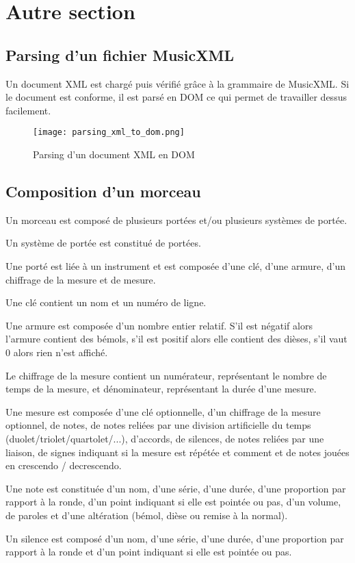 \section{Autre section}

\subsection{Parsing d'un fichier MusicXML}

Un document XML est chargé puis vérifié grâce à la grammaire de MusicXML. Si le document est conforme, il est parsé en DOM ce qui permet de travailler dessus facilement.

\begin{figure}[!h]
\centering
\texttt{[image: parsing\_xml\_to\_dom.png]}\\[1cm]
\caption{Parsing d'un document XML en DOM}
\label{Parsing d'un document XML en DOM}
\end{figure}



\subsection{Composition d'un morceau}


Un morceau est composé de plusieurs portées et/ou plusieurs systèmes de portée.
\par
Un système de portée est constitué de portées.
\par
Une porté est liée à un instrument et est composée d’une clé, d’une armure, d’un chiffrage de la mesure et de mesure.
\par
Une clé contient un nom et un numéro de ligne.
\par
Une armure est composée d'un nombre entier relatif. S'il est négatif alors l'armure contient des bémols, s'il est positif alors elle contient des dièses, s'il vaut 0 alors rien n'est affiché.
\par
Le chiffrage de la mesure contient un numérateur, représentant le nombre de temps de la mesure, et dénominateur, représentant la durée d’une mesure.
\par
Une mesure est composée d'une clé optionnelle, d'un chiffrage de la mesure optionnel, de notes, de notes reliées par une division artificielle du temps (duolet/triolet/quartolet/...), d'accords, de silences, de notes reliées par une liaison, de signes indiquant si la mesure est répétée et comment et de notes jouées en crescendo / decrescendo.
\par
Une note est constituée d'un nom, d'une série, d'une durée, d'une proportion par rapport à la ronde, d'un point indiquant si elle est pointée ou pas, d'un volume, de paroles et d'une altération (bémol, dièse ou remise à la normal).
\par
Un silence est composé d'un nom, d'une série, d'une durée, d'une proportion par rapport à la ronde et d'un point indiquant si elle est pointée ou pas.

